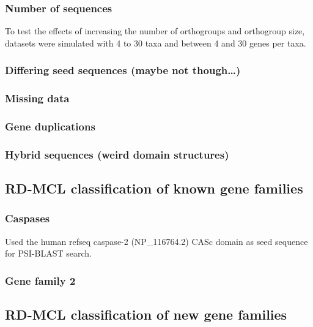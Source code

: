 \documentclass[twocolumn]{bmcart}%
\begin{document}
\subsubsection{Number of sequences}
To test the effects of increasing the number of orthogroups and orthogroup size, datasets were simulated with 4 to 30 taxa and between 4 and 30 genes per taxa.

\subsubsection{Differing seed sequences (maybe not though\ldots)}
\lipsum[2]

\subsubsection{Missing data}
\lipsum[1]

\subsubsection{Gene duplications}
\lipsum[1]

\subsubsection{Hybrid sequences (weird domain structures)}
\lipsum[1]

\subsection{RD-MCL classification of known gene families}\label{subsec:rd-mclClassificationOfKnownGeneFamilies}
\lipsum[1]

\subsubsection{Caspases}
Used the human refseq caspase-2 (NP\_116764.2) CASc domain as seed sequence for PSI-BLAST search.

\subsubsection{Gene family 2}
\lipsum[1]

\subsection{RD-MCL classification of new gene families}\label{subsec:rd-mclClassificationOfNewGeneFamilies}
\lipsum[1]
\end{document}
